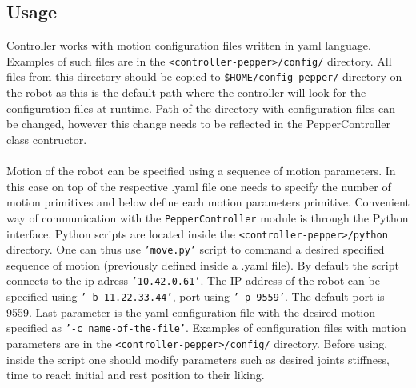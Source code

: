 \subsection{Usage}
\noindent Controller works with motion configuration files written in yaml language. Examples of such files are in the
\texttt{<controller-pepper>/config/} directory. All files from this directory should be copied to
\texttt{\$HOME/config-pepper/} directory on the robot as this is the default path where the controller will look for the configuration files 
at runtime. Path of the directory with configuration files can be changed, however this change needs to be reflected in
the PepperController class contructor.\\ \\
\noindent Motion of the robot can be specified using a sequence of motion parameters. In this case on top of the
respective .yaml file one needs to specify the number of motion primitives and below define each motion parameters
primitive.
\noindent Convenient way of communication with the \texttt{PepperController} module is through the Python interface. Python scripts are located
inside the \texttt{<controller-pepper>/python} directory. One can thus use \texttt{'move.py'} script to command a desired specified
sequence of motion (previously defined inside a .yaml file). By default the script connects to the ip adress
\texttt{'10.42.0.61'}. The IP address of the robot can be specified using \texttt{'-b 11.22.33.44'}, port using
\texttt{'-p 9559'}. The default port is 9559. Last parameter is the yaml configuration file with the desired motion specified as 
\texttt{'-c name-of-the-file'}. Examples of configuration files with motion parameters are in the
\texttt{<controller-pepper>/config/} directory. Before using, inside the script one should modify parameters such as desired joints stiffness,
time to reach initial and rest position to their liking.\\ \\

